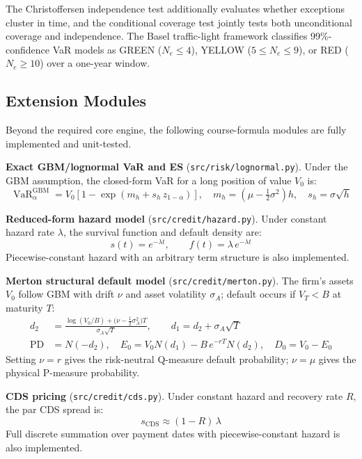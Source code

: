 \documentclass[11pt]{article}
\newcommand{\code}[1]{\texttt{#1}}
\DeclareMathOperator{\VaR}{VaR}
\begin{document}
The Christoffersen independence test additionally evaluates whether exceptions
cluster in time, and the conditional coverage test jointly tests both
unconditional coverage and independence.  The Basel traffic-light framework
classifies 99\%-confidence VaR models as GREEN ($N_e \leq 4$), YELLOW
($5 \leq N_e \leq 9$), or RED ($N_e \geq 10$) over a one-year window.

\subsection{Extension Modules}

Beyond the required core engine, the following course-formula modules are fully
implemented and unit-tested.

\textbf{Exact GBM/lognormal VaR and ES} (\code{src/risk/lognormal.py}).
Under the GBM assumption, the closed-form VaR for a long position of value
$V_0$ is:
\begin{equation}
  \VaR_\alpha^{\mathrm{GBM}} = V_0\!\left[1 - \exp\!\left(m_h + s_h\,z_{1-\alpha}\right)\right],
  \quad m_h = \left(\mu - \tfrac{1}{2}\sigma^2\right)h,\quad s_h = \sigma\sqrt{h}
  \label{eq:gbm_var}
\end{equation}

\textbf{Reduced-form hazard model} (\code{src/credit/hazard.py}).  Under
constant hazard rate $\lambda$, the survival function and default density are:
\begin{equation}
  s(t) = e^{-\lambda t}, \qquad f(t) = \lambda\, e^{-\lambda t}
  \label{eq:hazard}
\end{equation}
Piecewise-constant hazard with an arbitrary term structure is also implemented.

\textbf{Merton structural default model} (\code{src/credit/merton.py}).
The firm's assets $V_0$ follow GBM with drift $\nu$ and asset volatility
$\sigma_A$; default occurs if $V_T < B$ at maturity $T$:
\begin{align}
  d_2 &= \frac{\log(V_0/B) + \bigl(\nu - \tfrac{1}{2}\sigma_A^2\bigr)T}
              {\sigma_A\sqrt{T}},
  \qquad d_1 = d_2 + \sigma_A\sqrt{T}
  \label{eq:merton_d}\\[4pt]
  \mathrm{PD} &= N(-d_2),
  \quad E_0 = V_0 N(d_1) - B\,e^{-rT} N(d_2),
  \quad D_0 = V_0 - E_0
  \label{eq:merton_pd}
\end{align}
Setting $\nu = r$ gives the risk-neutral Q-measure default probability;
$\nu = \mu$ gives the physical P-measure probability.

\textbf{CDS pricing} (\code{src/credit/cds.py}).  Under constant hazard and
recovery rate $R$, the par CDS spread is:
\begin{equation}
  s_{\mathrm{CDS}} \approx (1-R)\,\lambda
  \label{eq:cds_spread}
\end{equation}
Full discrete summation over payment dates with piecewise-constant hazard is
also implemented.
\end{document}
